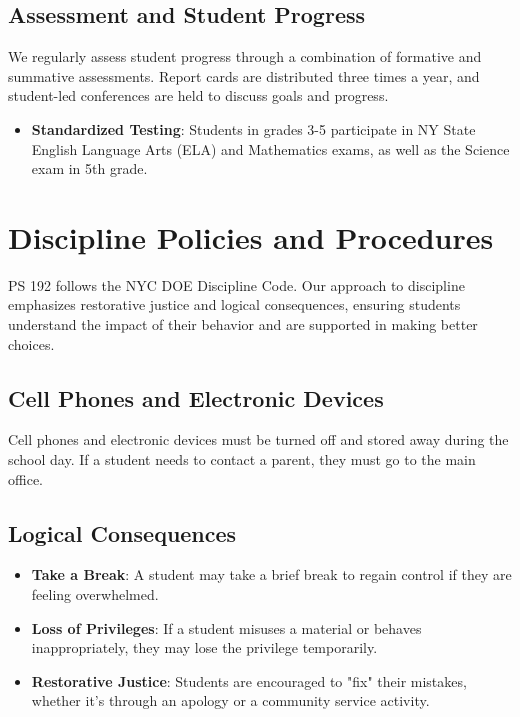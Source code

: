 \documentclass[11pt]{article}
\begin{document}
\subsection{Assessment and Student Progress}
\label{sec:org00cf37b}
We regularly assess student progress through a combination of formative and summative assessments. Report cards are distributed three times a year, and student-led conferences are held to discuss goals and progress.

\begin{itemize}
\item \textbf{\textbf{Standardized Testing}}: Students in grades 3-5 participate in NY State English Language Arts (ELA) and Mathematics exams, as well as the Science exam in 5th grade.
\end{itemize}

\section{Discipline Policies and Procedures}
\label{sec:orgfcb9371}
PS 192 follows the NYC DOE Discipline Code. Our approach to discipline emphasizes restorative justice and logical consequences, ensuring students understand the impact of their behavior and are supported in making better choices.

\subsection{Cell Phones and Electronic Devices}
\label{sec:orgc49cd70}
Cell phones and electronic devices must be turned off and stored away during the school day. If a student needs to contact a parent, they must go to the main office.

\subsection{Logical Consequences}
\label{sec:orgee840c3}
\begin{itemize}
\item \textbf{\textbf{Take a Break}}: A student may take a brief break to regain control if they are feeling overwhelmed.
\item \textbf{\textbf{Loss of Privileges}}: If a student misuses a material or behaves inappropriately, they may lose the privilege temporarily.
\item \textbf{\textbf{Restorative Justice}}: Students are encouraged to "fix" their mistakes, whether it’s through an apology or a community service activity.
\end{itemize}
\end{document}
